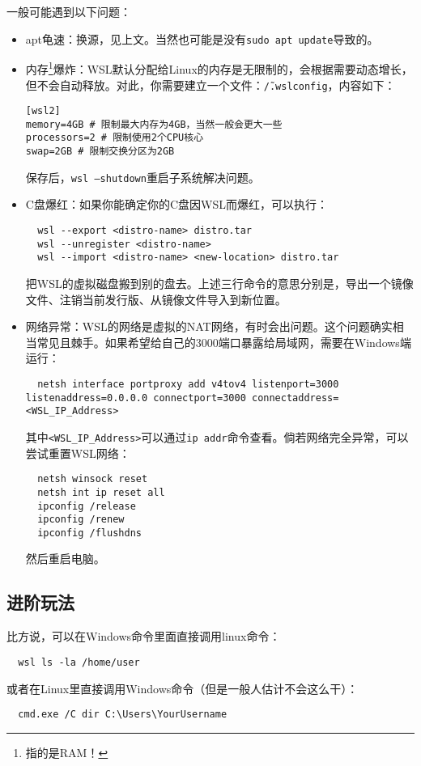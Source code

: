 一般可能遇到以下问题：
\begin{itemize}
  \item apt龟速：换源，见上文。当然也可能是没有\texttt{sudo apt update}导致的。
  \item 内存\footnote{指的是RAM！}爆炸：WSL默认分配给Linux的内存是无限制的，会根据需要动态增长，但不会自动释放。对此，你需要建立一个文件：\texttt{\~/.wslconfig}，内容如下：
\begin{lstlisting}
[wsl2]
memory=4GB # 限制最大内存为4GB，当然一般会更大一些
processors=2 # 限制使用2个CPU核心
swap=2GB # 限制交换分区为2GB
\end{lstlisting}
保存后，\texttt{wsl --shutdown}重启子系统解决问题。
  \item C盘爆红：如果你能确定你的C盘因WSL而爆红，可以执行：
\begin{lstlisting}
  wsl --export <distro-name> distro.tar
  wsl --unregister <distro-name>
  wsl --import <distro-name> <new-location> distro.tar
\end{lstlisting}
  把WSL的虚拟磁盘搬到别的盘去。上述三行命令的意思分别是，导出一个镜像文件、注销当前发行版、从镜像文件导入到新位置。
  \item 网络异常：WSL的网络是虚拟的NAT网络，有时会出问题。这个问题确实相当常见且棘手。如果希望给自己的3000端口暴露给局域网，需要在Windows端运行：
\begin{lstlisting}
  netsh interface portproxy add v4tov4 listenport=3000 listenaddress=0.0.0.0 connectport=3000 connectaddress=<WSL_IP_Address>
\end{lstlisting}
  其中\texttt{<WSL\_IP\_Address>}可以通过\texttt{ip addr}命令查看。倘若网络完全异常，可以尝试重置WSL网络：
\begin{lstlisting}
  netsh winsock reset
  netsh int ip reset all
  ipconfig /release
  ipconfig /renew
  ipconfig /flushdns
\end{lstlisting}
  然后重启电脑。
\end{itemize}

\subsection{进阶玩法}

比方说，可以在Windows命令里面直接调用linux命令：
\begin{lstlisting}
  wsl ls -la /home/user
\end{lstlisting}
或者在Linux里直接调用Windows命令（但是一般人估计不会这么干）：
\begin{lstlisting}
  cmd.exe /C dir C:\Users\YourUsername
\end{lstlisting}

